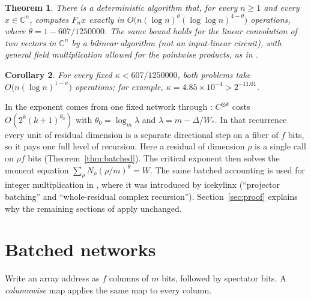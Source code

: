 \documentclass[11pt]{article}
\newtheorem{theorem}{Theorem}[section]
\newtheorem{corollary}[theorem]{Corollary}
\theoremstyle{definition}
\begin{document}
\begin{theorem}\label{thm:main}
There is a deterministic algorithm that, for every $n\ge1$ and every
$x\in\mathbb C^n$, computes $F_nx$ exactly in
$O\bigl(n(\log n)^{\theta}(\log\log n)^{4-\theta}\bigr)$ operations,
where $\theta=1-607/1250000$. The same bound holds for the linear convolution
of two vectors in $\mathbb C^n$ by a bilinear algorithm (not an input-linear
circuit), with general field multiplication allowed for the pointwise products,
as in \cite[Corollary~1.3]{oai-dft}.
\end{theorem}

\begin{corollary}
For every fixed $\kappa<607/1250000$, both problems take
$O\bigl(n(\log n)^{1-\kappa}\bigr)$ operations; for example,
$\kappa=4.85\times10^{-4}>2^{-11.01}$.
\end{corollary}

In \cite{oai-dft} the exponent comes from one fixed network through
\cite[Theorem~2.6]{oai-dft}: $C^{\otimes k}$ costs $O(2^k(k+1)^{\theta_0})$
with $\theta_0=\log_m\lambda$ and $\lambda=m-\Delta/W_*$. In that recurrence every
unit of residual dimension is a separate directional step on a fiber of $f$
bits, so it pays one full level of recursion. Here a residual of dimension
$\rho$ is a single call on $\rho f$ bits (Theorem~\ref{thm:batched}). The
critical exponent then solves the moment equation
$\sum_\rho N_\rho(\rho/m)^\theta=W$. The same batched accounting is used for
integer multiplication in \cite{cms}, where it was introduced by icekylinx
(``projector batching'' and ``whole-residual complex recursion'').
Section~\ref{sec:proof} explains why the remaining sections of \cite{oai-dft}
apply unchanged.

\section{Batched networks}
Write an array address as $f$ columns of $m$ bits, followed by spectator bits.
A \emph{columnwise} map applies the same map to every column.
\end{document}

